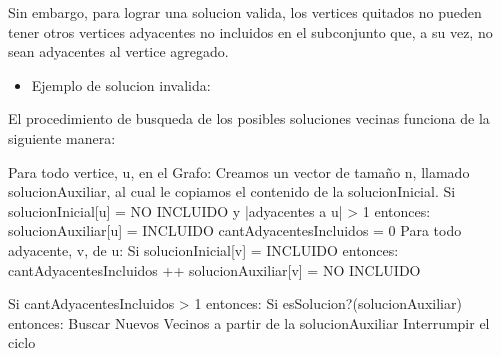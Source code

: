Sin embargo, para lograr una solucion valida, los vertices quitados no pueden tener otros vertices adyacentes no incluidos en el subconjunto que, a su vez, no sean adyacentes al vertice agregado.

\begin{itemize}
	\item Ejemplo de solucion invalida:


\end{itemize}

El procedimiento de busqueda de los posibles soluciones vecinas funciona de la siguiente manera:

\begin{codesnippet}
Para todo vertice, u, en el Grafo:
  Creamos un vector de tamaño n, llamado solucionAuxiliar, al cual le copiamos
  el contenido de la solucionInicial.
  Si solucionInicial[u] = NO INCLUIDO y |adyacentes a u| > 1 entonces:
     solucionAuxiliar[u] = INCLUIDO
     cantAdyacentesIncluidos = 0
     Para todo adyacente, v, de u:
         Si solucionInicial[v] = INCLUIDO entonces:
             cantAdyacentesIncluidos ++
             solucionAuxiliar[v] = NO INCLUIDO

  Si cantAdyacentesIncluidos > 1 entonces:
     Si esSolucion?(solucionAuxiliar) entonces:
       Buscar Nuevos Vecinos a partir de la solucionAuxiliar
       Interrumpir el ciclo

\end{codesnippet}

